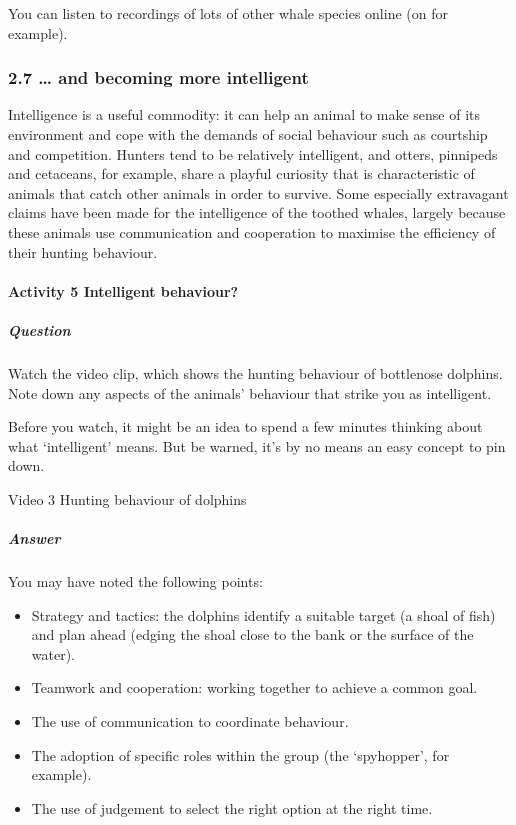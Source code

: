 \documentclass[letterpaper,10pt,english]{sphinxmanual}
\begin{document}
You can listen to recordings of lots of other whale species online (on  for example).


\subsubsection{2.7 … and becoming more intelligent}
\label{\detokenize{content/session_00/Part_00_02:2.7-_u2026-and-becoming-more-intelligent}}
Intelligence is a useful commodity: it can help an animal to make sense of its environment and cope with the demands of social behaviour such as courtship and competition. Hunters tend to be relatively intelligent, and otters, pinnipeds and cetaceans, for example, share a playful curiosity that is characteristic of animals that catch other animals in order to survive. Some especially extravagant claims have been made for the intelligence of the toothed whales, largely because these animals use
communication and cooperation to maximise the efficiency of their hunting behaviour.


\paragraph{Activity 5 Intelligent behaviour?}
\label{\detokenize{content/session_00/Part_00_02:Activity-5-Intelligent-behaviour?}}


\subparagraph{Question}
\label{\detokenize{content/session_00/Part_00_02:id4}}
Watch the video clip, which shows the hunting behaviour of bottlenose dolphins. Note down any aspects of the animals’ behaviour that strike you as intelligent.

Before you watch, it might be an idea to spend a few minutes thinking about what ‘intelligent’ means. But be warned, it’s by no means an easy concept to pin down.

Video 3 Hunting behaviour of dolphins




\subparagraph{Answer}
\label{\detokenize{content/session_00/Part_00_02:id5}}
You may have noted the following points:
\begin{itemize}
\item {} 
Strategy and tactics: the dolphins identify a suitable target (a shoal of fish) and plan ahead (edging the shoal close to the bank or the surface of the water).

\item {} 
Teamwork and cooperation: working together to achieve a common goal.

\item {} 
The use of communication to coordinate behaviour.

\item {} 
The adoption of specific roles within the group (the ‘spy\sphinxhyphen{}hopper’, for example).

\item {} 
The use of judgement to select the right option at the right time.

\end{itemize}
\end{document}
